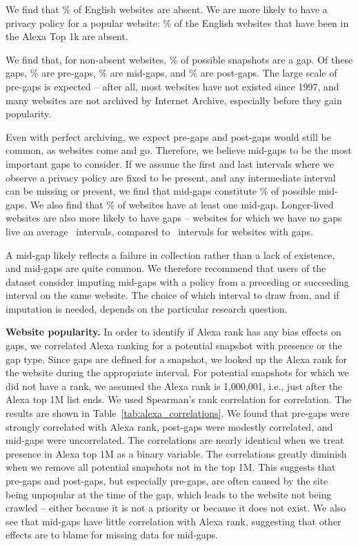 We find that \absentEngPerc\% of English websites are absent. We are more likely to have a privacy policy for a popular website: \absentEngOneKPerc\% of the English websites that have been in the Alexa Top 1k are absent.

We find that, for non-absent websites, \gapsPerc\% of possible snapshots are a gap. Of these gaps, \pregapsPerc\% are pre-gaps, \midgapsPerc\% are mid-gaps, and \postgapsPerc\% are post-gaps. The large scale of pre-gaps is expected -- after all, most websites have not existed since 1997, and many websites are not archived by Internet Archive, especially before they gain popularity.

Even with perfect archiving, we expect pre-gaps and post-gaps would still be common, as websites come and go. Therefore, we believe mid-gaps to be the most important gaps to consider. If we assume the first and last intervals where we observe a privacy policy are fixed to be present, and any intermediate interval can be missing or present, we find that mid-gaps constitute \midgapsPossPerc\% of possible mid-gaps. We also find that \midgapsDomainsPerc\% of websites have at least one mid-gap. Longer-lived websites are also more likely to have gaps -- websites for which we have no gaps live an average \lifespanNoGaps~intervals, compared to \lifespanGaps~intervals for websites with gaps.

A mid-gap likely reflects a failure in collection rather than a lack of existence, and mid-gaps are quite common. We therefore recommend that users of the dataset consider imputing mid-gaps with a policy from a preceding or succeeding interval on the same website. The choice of which interval to draw from, and if imputation is needed, depends on the particular research question.

{\textbf{Website popularity.}}
In order to identify if Alexa rank has any bias effects on gaps, we correlated Alexa ranking for a potential snapshot with presence or the gap type. Since gaps are defined for a snapshot, we looked up the Alexa rank for the website during the appropriate interval. For potential snapshots for which we did not have a rank, we assumed the Alexa rank is 1,000,001, i.e., just after the Alexa top 1M list ends. We used Spearman's rank correlation for correlation. The results are shown in Table~\ref{tab:alexa_correlations}. We found that pre-gaps were strongly correlated with Alexa rank, post-gaps were modestly correlated, and mid-gaps were uncorrelated. The correlations are nearly identical when we treat presence in Alexa top 1M as a binary variable. The correlations greatly diminish when we remove all potential snapshots not in the top 1M. This suggests that pre-gaps and post-gaps, but especially pre-gaps, are often caused by the site being unpopular at the time of the gap, which leads to the website not being crawled -- either because it is not a priority or because it does not exist. We also see that mid-gaps have little correlation with Alexa rank, suggesting that other effects are to blame for missing data for mid-gaps.

